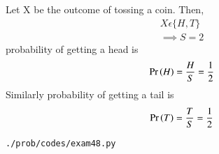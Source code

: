 Let X be the outcome of tossing a coin. Then,
\begin{align}
X \epsilon \{H,T\}
\\
\implies S=2
\end{align}
probability of getting a head is
\begin{align}
\Pr\left(H\right)=\frac{H}{S}=\frac{1}{2}
\end{align}
Similarly probability of getting a tail is
\begin{align}
\Pr\left(T\right)=\frac{T}{S}=\frac{1}{2}
\end{align}
\begin{lstlisting}
./prob/codes/exam48.py
\end{lstlisting}
